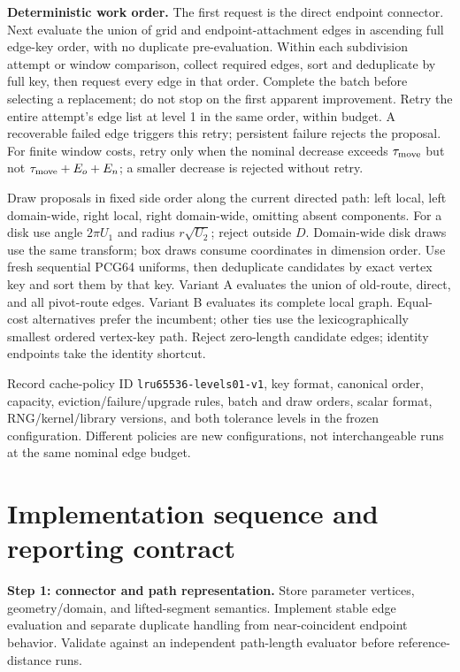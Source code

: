\documentclass[11pt,letterpaper]{article}
\newcommand{\src}[1]{\nolinkurl{#1}}
\begin{document}
\textbf{Deterministic work order.} The first request is the direct endpoint connector. Next evaluate the union of grid and endpoint-attachment edges in ascending full edge-key order, with no duplicate pre-evaluation. Within each subdivision attempt or window comparison, collect required edges, sort and deduplicate by full key, then request every edge in that order. Complete the batch before selecting a replacement; do not stop on the first apparent improvement. Retry the entire attempt's edge list at level 1 in the same order, within budget. A recoverable failed edge triggers this retry; persistent failure rejects the proposal. For finite window costs, retry only when the nominal decrease exceeds $\tau_{\rm move}$ but not $\tau_{\rm move}+E_o+E_n$; a smaller decrease is rejected without retry.

Draw proposals in fixed side order along the current directed path: left local, left domain-wide, right local, right domain-wide, omitting absent components. For a disk use angle $2\pi U_1$ and radius $r\sqrt{U_2}$; reject outside $D$. Domain-wide disk draws use the same transform; box draws consume coordinates in dimension order. Use fresh sequential PCG64 uniforms, then deduplicate candidates by exact vertex key and sort them by that key. Variant A evaluates the union of old-route, direct, and all pivot-route edges. Variant B evaluates its complete local graph. Equal-cost alternatives prefer the incumbent; other ties use the lexicographically smallest ordered vertex-key path. Reject zero-length candidate edges; identity endpoints take the identity shortcut.

Record cache-policy ID \src{lru65536-levels01-v1}, key format, canonical order, capacity, eviction/failure/upgrade rules, batch and draw orders, scalar format, RNG/kernel/library versions, and both tolerance levels in the frozen configuration. Different policies are new configurations, not interchangeable runs at the same nominal edge budget.

\section{Implementation sequence and reporting contract}
\textbf{Step 1: connector and path representation.} Store parameter vertices, geometry/domain, and lifted-segment semantics. Implement stable edge evaluation and separate duplicate handling from near-coincident endpoint behavior. Validate against an independent path-length evaluator before reference-distance runs.
\end{document}
